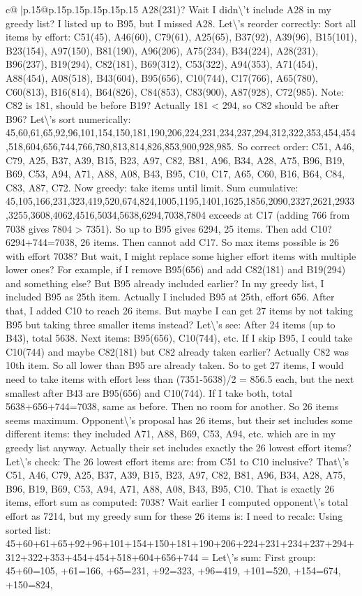 \documentclass{article}
\begin{document}
{\begin{supertabular}{c@{$\;$}|p{.15\linewidth}@{}p{.15\linewidth}p{.15\linewidth}p{.15\linewidth}p{.15\linewidth}p{.15\linewidth}}
{{{A28(231)? Wait I didn\textbackslash{}'t include A28 in my greedy list? I listed up to B95, but I missed A28. Let\textbackslash{}'s reorder correctly: Sort all items by effort: C51(45), A46(60), C79(61), A25(65), B37(92), A39(96), B15(101), B23(154), A97(150), B81(190), A96(206), A75(234), B34(224), A28(231), B96(237), B19(294), C82(181), B69(312), C53(322), A94(353), A71(454), A88(454), A08(518), B43(604), B95(656), C10(744), C17(766), A65(780), C60(813), B16(814), B64(826), C84(853), C83(900), A87(928), C72(985). Note: C82 is 181, should be before B19? Actually 181 < 294, so C82 should be after B96? Let\textbackslash{}'s sort numerically: 45,60,61,65,92,96,101,154,150,181,190,206,224,231,234,237,294,312,322,353,454,454,518,604,656,744,766,780,813,814,826,853,900,928,985. So correct order: C51, A46, C79, A25, B37, A39, B15, B23, A97, C82, B81, A96, B34, A28, A75, B96, B19, B69, C53, A94, A71, A88, A08, B43, B95, C10, C17, A65, C60, B16, B64, C84, C83, A87, C72. Now greedy: take items until limit. Sum cumulative: 45,105,166,231,323,419,520,674,824,1005,1195,1401,1625,1856,2090,2327,2621,2933,3255,3608,4062,4516,5034,5638,6294,7038,7804 exceeds at C17 (adding 766 from 7038 gives 7804 > 7351). So up to B95 gives 6294, 25 items. Then add C10? 6294+744=7038, 26 items. Then cannot add C17. So max items possible is 26 with effort 7038? But wait, I might replace some higher effort items with multiple lower ones? For example, if I remove B95(656) and add C82(181) and B19(294) and something else? But B95 already included earlier? In my greedy list, I included B95 as 25th item. Actually I included B95 at 25th, effort 656. After that, I added C10 to reach 26 items. But maybe I can get 27 items by not taking B95 but taking three smaller items instead? Let\textbackslash{}'s see: After 24 items (up to B43), total 5638. Next items: B95(656), C10(744), etc. If I skip B95, I could take C10(744) and maybe C82(181) but C82 already taken earlier? Actually C82 was 10th item. So all lower than B95 are already taken. So to get 27 items, I would need to take items with effort less than (7351{-}5638)/2 = 856.5 each, but the next smallest after B43 are B95(656) and C10(744). If I take both, total 5638+656+744=7038, same as before. Then no room for another. So 26 items seems maximum. Opponent\textbackslash{}'s proposal has 26 items, but their set includes some different items: they included A71, A88, B69, C53, A94, etc. which are in my greedy list anyway. Actually their set includes exactly the 26 lowest effort items? Let\textbackslash{}'s check: The 26 lowest effort items are: from C51 to C10 inclusive? That\textbackslash{}'s C51, A46, C79, A25, B37, A39, B15, B23, A97, C82, B81, A96, B34, A28, A75, B96, B19, B69, C53, A94, A71, A88, A08, B43, B95, C10. That is exactly 26 items, effort sum as computed: 7038? Wait earlier I computed opponent\textbackslash{}'s total effort as 7214, but my greedy sum for these 26 items is: I need to recalc: Using sorted list: 45+60+61+65+92+96+101+154+150+181+190+206+224+231+234+237+294+312+322+353+454+454+518+604+656+744 = Let\textbackslash{}'s sum: First group: 45+60=105, +61=166, +65=231, +92=323, +96=419, +101=520, +154=674, +150=824, }}}
\end{supertabular}}
\end{document}
